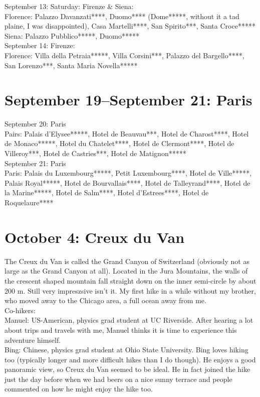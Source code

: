 September 13: Saturday: Firenze \& Siena:\\
Florence: Palazzo Davanzati****, Duomo**** (Dome*****, without it a tad plaine, I was disappointed), Casa Martelli****, San Spirito***, Santa Croce*****
Siena: Palazzo Pubblico*****, Duomo*****\\

September 14: Firenze:\\
Florence: Villa della Petraia*****, Villa Corsini***, Palazzo del Bargello****, San Lorenzo***, Santa Maria Novella*****

\section{September 19--September 21: Paris}
\label{Paris2014}

September 20: Paris\\
Pairs: Palais d'Elysee*****, Hotel de Beauvau***, Hotel de Charost****, Hotel de Monaco*****, Hotel du Chatelet****, Hotel de Clermont****, Hotel de Villeroy***, Hotel de Castries***, Hotel de Matignon*****\\

September 21: Paris\\
Paris: Palais du Luxembourg*****, Petit Luxembourg****, Hotel de Ville*****, Palais Royal*****, Hotel de Bourvallais****, Hotel de Talleyrand****, Hotel de la Marine*****, Hotel de Salm****, Hotel d'Estrees****, Hotel de Roquelaure****

\section{October 4: Creux du Van}
\label{Creuxduvan2014}

The Creux du Van is called the Grand Canyon of Switzerland (obviously not as large as the Grand Canyon at all). Located in the Jura Mountains, the walls of the crescent shaped mountain fall straight down on the inner semi-circle by about 200 m. Still very impreszsive isn't it. My first hike in a while without my brother, who moved away to the Chicago area, a full ocean away from me.\\

Co-hikers:\\
Manuel: US-American, physics grad student at UC Riverside. After hearing a lot about trips and travels with me, Manuel thinks it is time to experience this adventure himself.\\
Bing: Chinese, physics grad student at Ohio State University. Bing loves hiking too (typically longer and more difficult hikes than I do though). He enjoys a good panoramic view, so Creux du Van seemed to be ideal. He in fact joined the hike just the day before when we had beers on a nice sunny terrace and people commented on how he might enjoy the hike too.\\

